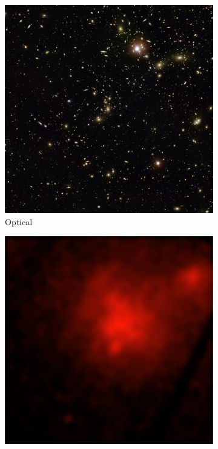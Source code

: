 \begin{figure}[h!]
    \centering
    \begin{subfigure}{0.31\textwidth}
        \centering
        \includegraphics[width=\linewidth]{Images/Chapter3/a2744_w33.jpg}
        \caption{Optical}
        \label{fig:hubble_abell2744}
    \end{subfigure}
    \hspace{2mm}
    \begin{subfigure}{0.31\textwidth}
        \centering
        \includegraphics[width=\linewidth]{Images/Chapter3/a2744_w22.jpg}

\end{subfigure}
\end{figure}
